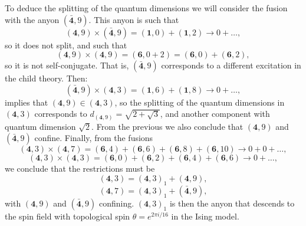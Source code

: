 \documentclass[11pt]{article}
\numberwithin{equation}{section}
\begin{document}
To deduce the splitting of the quantum dimensions we will consider the fusion with the anyon $(\mathbf{\bar{4}},9)$. This anyon is such that
\begin{equation}
    (\mathbf{4},9) \times (\mathbf{\bar{4}},9) = (\mathbf{1},0) + (\mathbf{1},2) \longrightarrow 0 + \ldots,
\end{equation}
so it does not split, and such that
\begin{equation}
    (\mathbf{4},9) \times (\mathbf{4},9) = (\mathbf{6},0+2) = (\mathbf{6},0) + (\mathbf{6},2),
\end{equation}
so it is not self-conjugate. That is, $(\mathbf{\bar{4}},9)$ corresponds to a different excitation in the child theory. Then:
\begin{equation}
    (\mathbf{\bar{4}},9) \times (\mathbf{4},3) = (\mathbf{1},6) + (\mathbf{1},8) \longrightarrow 0 + \ldots,
\end{equation}
implies that $(\mathbf{4},9) \in (\mathbf{4},3)$, so the splitting of the quantum dimensions in $(\mathbf{4},3)$ corresponds to $d_{(\mathbf{4},9)} = \sqrt{2+\sqrt{3}}$, and another component with quantum dimension $\sqrt{2}$. From the previous we also conclude that $(\mathbf{4},9)$ and $(\mathbf{\bar{4}},9)$ confine.
Finally, from the fusions
\begin{equation}
    (\mathbf{4},3) \times (\mathbf{4},7) = (\mathbf{6},4) + (\mathbf{6},6) + (\mathbf{6},8) + (\mathbf{6},10) \longrightarrow 0 + 0 + \ldots,
\end{equation}
\begin{equation}
    (\mathbf{4},3) \times (\mathbf{4},3) = (\mathbf{6},0) + (\mathbf{6},2) + (\mathbf{6},4) + (\mathbf{6},6) \longrightarrow 0 + \ldots,
\end{equation}
we conclude that the restrictions must be
\begin{equation}
    (\mathbf{4},3) = (\mathbf{4},3)_{1} + (\mathbf{4},9),
\end{equation}
\begin{equation}
    (\mathbf{4},7) = (\mathbf{4},3)_{1} + (\mathbf{\bar{4}},9),
\end{equation}
with $(\mathbf{4},9)$ and $(\mathbf{\bar{4}},9)$ confining. $(\mathbf{4},3)_{1}$ is then the anyon that descends to the spin field with topological spin $\theta = e^{2 \pi i /16}$ in the Ising model.
\end{document}
